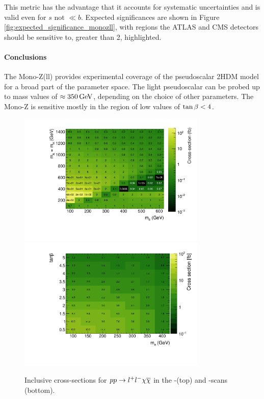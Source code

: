 This metric has the advantage that it accounts for systematic uncertainties and is valid even for $s$ not $\ll b$.  Expected significances are shown in Figure \ref{fig:expected_significance_monozll}, with regions the ATLAS and CMS detectors should be sensitive to, greater than 2, highlighted.



\paragraph{Conclusions} The Mono-Z(ll) provides experimental coverage of the pseudoscalar 2HDM model for a broad part of the parameter space. The light pseudoscalar \a can be probed up to mass values of $\approx\unit[350]{GeV}$, depending on the choice of other parameters. The Mono-Z is sensitive mostly in the region of low values of $\tan\beta<4$.

\begin{figure}
\centering
\includegraphics[width=0.8\textwidth]{texinputs/04_grid/figures/monoz/leptonic/xs_2d_inclusive_26300.pdf}
\includegraphics[width=0.8\textwidth]{texinputs/04_grid/figures/monoz/leptonic/tanbma_xsec_ll.pdf}
\caption{Inclusive cross-sections for $pp\rightarrow l^{+}l^{-}\chi\overline{\chi}$ in the \ma-\mA (top) and \ma-\tanb scans (bottom).}
\label{fig:monoz_ll_xs_inclusive}
\end{figure}


